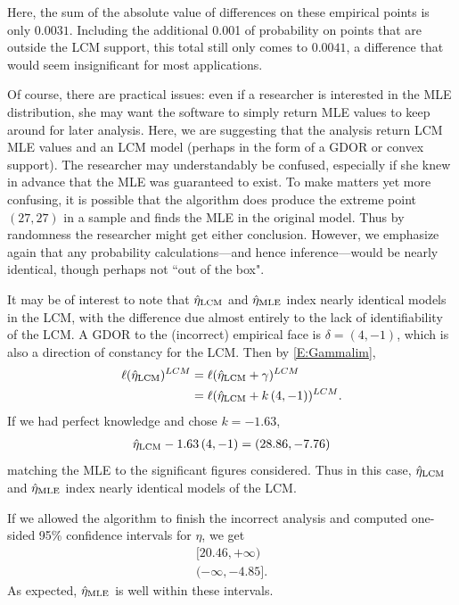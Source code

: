 Here, the sum of the absolute value of differences on these empirical points is only 
$0.0031$.  Including the additional 0.001 of probability on points that are outside 
the LCM support, this total still only comes to $0.0041$, a difference that would seem 
insignificant for most applications.  

Of course, there are practical issues: even if a researcher is interested in the 
MLE distribution, she may want the software to simply 
return MLE values to keep around for later analysis.  Here, we are suggesting that the 
analysis return LCM MLE values and an LCM model (perhaps in the form of a GDOR or
convex support).  The researcher may understandably be confused, especially if she knew in 
advance that the MLE was guaranteed to exist.  
To make matters yet more confusing, it is possible that the
algorithm does produce the extreme point $(27,27)$ in a sample and finds the MLE
in the original model.  Thus by randomness the researcher might get either conclusion.
However, we emphasize again that
any probability calculations---and hence inference---would be nearly identical, though perhaps not ``out of the box".

It may be of interest to note that $\hat{\eta}_{\textrm{LCM}}$ and $\hat{\eta}_{\textrm{MLE}}$ index nearly identical 
models in the LCM, with the difference due almost entirely to the lack of 
identifiability of the LCM.  A GDOR to the (incorrect) empirical face is 
$\delta = (4,-1)$, which is also a direction of constancy for the LCM. 
Then by \eqref{E:Gammalim}, 
\begin{align*}
	\ell(\hat{\eta}_{\textrm{LCM}})^{LCM} &= \ell( \hat{\eta}_{\textrm{LCM}} + \gamma )^{LCM}\\
				 &= 	\ell(\hat{\eta}_{\textrm{LCM}} + k \, (4,-1))^{LCM}.
\end{align*}
If we had perfect knowledge and chose $k = -1.63$,
\begin{align*}
	\hat{\eta}_{\textrm{LCM}}  -1.63 \, (4,-1)= (28.86, -7.76) 
\end{align*}
matching the MLE to the significant figures considered.  Thus in this case, $\hat{\eta}_{\textrm{LCM}}$ 
and $\hat{\eta}_{\textrm{MLE}}$ index nearly identical models of the LCM.

If we allowed the algorithm to finish the incorrect analysis and computed 
one-sided 95\% confidence intervals for $\eta$, we get 
\begin{align*}
	[20.46, +\infty)\\
	(-\infty, -4.85].
\end{align*}
As expected, $\hat{\eta}_{\textrm{MLE}}$ is well within these intervals.

